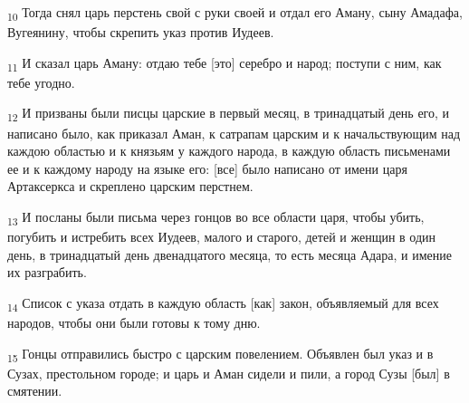 \begin{tcolorbox}
\textsubscript{10} Тогда снял царь перстень свой с руки своей и отдал его Аману, сыну Амадафа, Вугеянину, чтобы скрепить указ против Иудеев.
\end{tcolorbox}
\begin{tcolorbox}
\textsubscript{11} И сказал царь Аману: отдаю тебе [это] серебро и народ; поступи с ним, как тебе угодно.
\end{tcolorbox}
\begin{tcolorbox}
\textsubscript{12} И призваны были писцы царские в первый месяц, в тринадцатый день его, и написано было, как приказал Аман, к сатрапам царским и к начальствующим над каждою областью и к князьям у каждого народа, в каждую область письменами ее и к каждому народу на языке его: [все] было написано от имени царя Артаксеркса и скреплено царским перстнем.
\end{tcolorbox}
\begin{tcolorbox}
\textsubscript{13} И посланы были письма через гонцов во все области царя, чтобы убить, погубить и истребить всех Иудеев, малого и старого, детей и женщин в один день, в тринадцатый день двенадцатого месяца, то есть месяца Адара, и имение их разграбить.
\end{tcolorbox}
\begin{tcolorbox}
\textsubscript{14} Список с указа отдать в каждую область [как] закон, объявляемый для всех народов, чтобы они были готовы к тому дню.
\end{tcolorbox}
\begin{tcolorbox}
\textsubscript{15} Гонцы отправились быстро с царским повелением. Объявлен был указ и в Сузах, престольном городе; и царь и Аман сидели и пили, а город Сузы [был] в смятении.
\end{tcolorbox}
